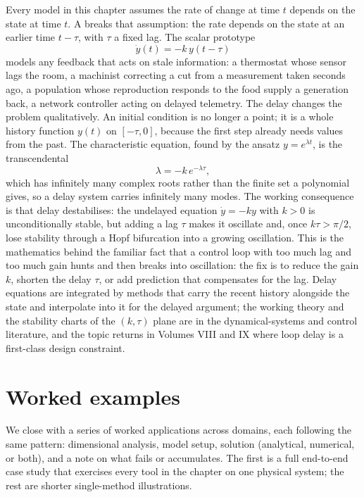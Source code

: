 \begin{mastery}
Every model in this chapter assumes the rate of change at time $t$
depends on the state at time $t$. A  breaks that assumption: the rate depends on the state at an
earlier time $t - \tau$, with $\tau$ a fixed lag. The scalar prototype
\[
\dot{y}(t) = -k\, y(t - \tau)
\]
models any feedback that acts on stale information: a thermostat whose
sensor lags the room, a machinist correcting a cut from a measurement
taken seconds ago, a population whose reproduction responds to the food
supply a generation back, a network controller acting on delayed
telemetry. The delay changes the problem qualitatively. An initial
condition is no longer a point; it is a whole history function
$y(t)$ on $[-\tau, 0]$, because the first step already needs values
from the past. The characteristic equation, found by the ansatz
$y = e^{\lambda t}$, is the transcendental
\[
\lambda = -k\, e^{-\lambda \tau},
\]
which has infinitely many complex roots rather than the finite set a
polynomial gives, so a delay system carries infinitely many modes. The
working consequence is that delay destabilises: the undelayed equation
$\dot{y} = -k y$ with $k > 0$ is unconditionally stable, but adding a
lag $\tau$ makes it oscillate and, once $k\tau > \pi/2$, lose stability
through a Hopf bifurcation into a growing oscillation. This is the
mathematics behind the familiar fact that a control loop with too much
lag and too much gain hunts and then breaks into oscillation: the fix
is to reduce the gain $k$, shorten the delay $\tau$, or add prediction
that compensates for the lag. Delay equations are integrated by
methods that carry the recent history alongside the state and
interpolate into it for the delayed argument; the working theory and
the stability charts of the $(k, \tau)$ plane are in the
dynamical-systems and control literature, and the topic returns in
Volumes VIII and IX where loop delay is a first-class design
constraint.
\end{mastery}

\section{Worked examples}

We close with a series of worked applications across domains, each
following the same pattern: dimensional analysis, model setup,
solution (analytical, numerical, or both), and a note on what
fails or accumulates. The first is a full end-to-end case study
that exercises every tool in the chapter on one physical system;
the rest are shorter single-method illustrations.

